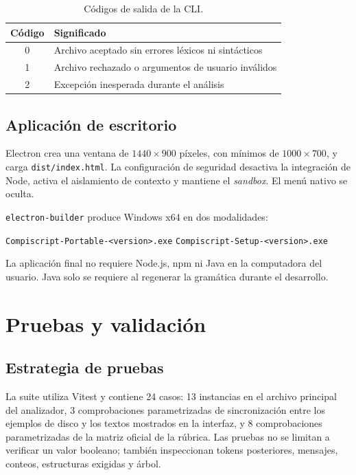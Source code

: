 \documentclass[12pt,letterpaper,oneside]{report}
\newcommand{\archivo}[1]{\texttt{#1}}
\begin{document}
\begin{table}[H]
\centering
\caption{Códigos de salida de la CLI.}
\label{tab:exit}
\begin{tabular}{c l}
\toprule
Código & Significado \\
\midrule
0 & Archivo aceptado sin errores léxicos ni sintácticos \\
1 & Archivo rechazado o argumentos de usuario inválidos \\
2 & Excepción inesperada durante el análisis \\
\bottomrule
\end{tabular}
\end{table}

\section{Aplicación de escritorio}

Electron crea una ventana de $1440\times900$ píxeles, con mínimos de
$1000\times700$, y carga \archivo{dist/index.html}. La configuración de seguridad
desactiva la integración de Node, activa el aislamiento de contexto y mantiene el
\emph{sandbox}. El menú nativo se oculta.

\archivo{electron-builder} produce Windows x64 en dos modalidades:

\begin{center}
\archivo{Compiscript-Portable-<version>.exe}\qquad
\archivo{Compiscript-Setup-<version>.exe}
\end{center}

La aplicación final no requiere Node.js, npm ni Java en la computadora del usuario.
Java solo se requiere al regenerar la gramática durante el desarrollo.

\chapter{Pruebas y validación}

\section{Estrategia de pruebas}

La suite utiliza Vitest y contiene 24 casos: 13 instancias en el archivo principal
del analizador, 3 comprobaciones parametrizadas de sincronización entre los ejemplos
de disco y los textos mostrados en la interfaz, y 8 comprobaciones parametrizadas de
la matriz oficial de la rúbrica. Las pruebas no se limitan a verificar un valor
booleano; también inspeccionan tokens posteriores, mensajes, conteos, estructuras
exigidas y árbol.
\end{document}
